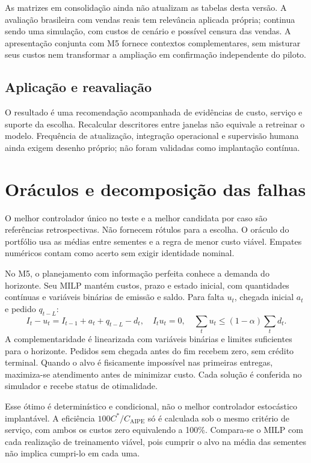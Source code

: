 As matrizes em consolidação ainda não atualizam as tabelas desta versão. A avaliação brasileira com vendas reais tem relevância aplicada própria; continua sendo uma simulação, com custos de cenário e possível censura das vendas. A apresentação conjunta com M5 fornece contextos complementares, sem misturar seus custos nem transformar a ampliação em confirmação independente do piloto.

\subsection{Aplicação e reavaliação}
\label{sec:aplicacao_aipe}
O resultado é uma recomendação acompanhada de evidências de custo, serviço e suporte da escolha. Recalcular descritores entre janelas não equivale a retreinar o modelo. Frequência de atualização, integração operacional e supervisão humana ainda exigem desenho próprio; não foram validadas como implantação contínua.

\section{Oráculos e decomposição das falhas}
O melhor controlador único no teste e a melhor candidata por caso são referências retrospectivas. Não fornecem rótulos para a escolha. O oráculo do portfólio usa as médias entre sementes e a regra de menor custo viável. Empates numéricos contam como acerto sem exigir identidade nominal.

No M5, o planejamento com informação perfeita conhece a demanda do horizonte. Seu MILP mantém custos, prazo e estado inicial, com quantidades contínuas e variáveis binárias de emissão e saldo. Para falta $u_t$, chegada inicial $a_t$ e pedido $q_{t-L}$:
\[
 I_t-u_t=I_{t-1}+a_t+q_{t-L}-d_t,\quad
 I_tu_t=0,\quad \sum_tu_t\leq(1-\alpha)\sum_td_t.
\]
A complementaridade é linearizada com variáveis binárias e limites suficientes para o horizonte. Pedidos sem chegada antes do fim recebem zero, sem crédito terminal. Quando o alvo é fisicamente impossível nas primeiras entregas, maximiza-se atendimento antes de minimizar custo. Cada solução é conferida no simulador e recebe status de otimalidade.

Esse ótimo é determinístico e condicional, não o melhor controlador estocástico implantável. A eficiência $100C^*/C_{\mathrm{AIPE}}$ só é calculada sob o mesmo critério de serviço, com ambos os custos zero equivalendo a 100\%. Compara-se o MILP com cada realização de treinamento viável, pois cumprir o alvo na média das sementes não implica cumpri-lo em cada uma.

